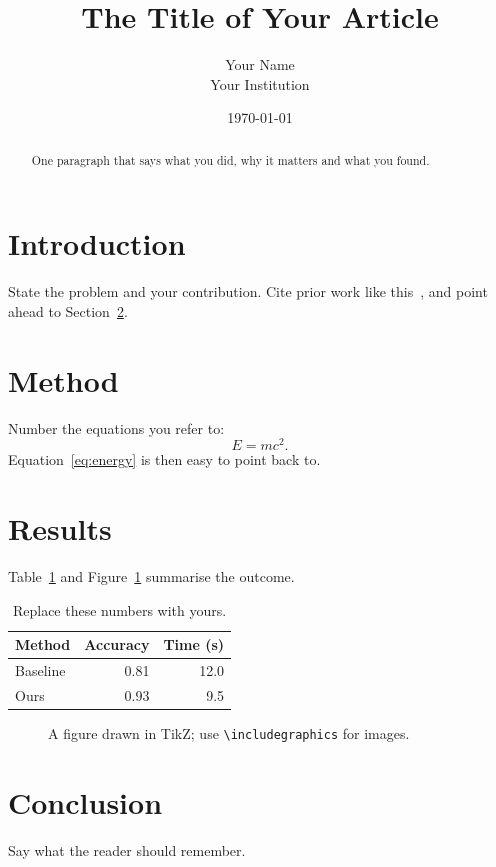 \documentclass[11pt]{article}
\title{The Title of Your Article}
\author{Your Name \\ \small Your Institution}
\date{\today}
\begin{document}
\maketitle

\begin{abstract}
One paragraph that says what you did, why it matters and what you found.
\end{abstract}

\section{Introduction}
\label{sec:intro}
State the problem and your contribution. Cite prior work like
this~\cite{knuth1984}, and point ahead to Section~\ref{sec:method}.

\section{Method}
\label{sec:method}
Number the equations you refer to:
\begin{equation}
  \label{eq:energy}
  E = m c^2 .
\end{equation}
Equation~\eqref{eq:energy} is then easy to point back to.

\section{Results}
Table~\ref{tab:results} and Figure~\ref{fig:sketch} summarise the outcome.

\begin{table}[h]
  \centering
  \begin{tabular}{lrr}
    \toprule
    Method   & Accuracy & Time (s) \\
    \midrule
    Baseline & 0.81     & 12.0     \\
    Ours     & 0.93     & 9.5      \\
    \bottomrule
  \end{tabular}
  \caption{Replace these numbers with yours.}
  \label{tab:results}
\end{table}

\begin{figure}[h]
  \centering
  \caption{A figure drawn in TikZ; use \texttt{\textbackslash includegraphics} for images.}
  \label{fig:sketch}
\end{figure}

\section{Conclusion}
Say what the reader should remember.

\printbibliography
\end{document}
